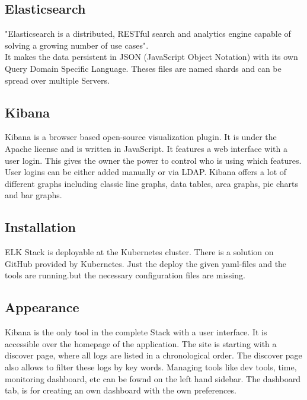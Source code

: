 \subsection{Elasticsearch}
\label{Elasticsearch}
"Elasticsearch is a distributed, RESTful search and analytics engine capable of solving a growing number of use cases"\cite{elasticsearch}.\\ It makes the data persistent in JSON (JavaScript Object Notation) with its own Query Domain Specific Language. Theses files are named shards and can be spread over multiple Servers.
\subsection{Kibana}
Kibana is a browser based open-source visualization plugin. It is under the Apache license and is written in JavaScript. It features a web interface with a user login. This gives the owner the power to control who is using which features. User logins can be either added manually or via LDAP.
Kibana offers a lot of different graphs including classic line graphs, data tables, area graphs, pie charts and bar graphs.
\subsection{Installation}
ELK Stack is deployable at the Kubernetes cluster. There is a solution on GitHub provided by Kubernetes. Just the deploy the given yaml-files and the tools are running.but the necessary configuration files are missing.
\subsection{Appearance}%
Kibana is the only tool in the complete Stack with a user interface. It is accessible over the homepage of the application. The site is starting with a discover page, where all logs are listed in a chronological order. The discover page also allows to filter these logs by key words. Managing tools like dev tools, time, monitoring dashboard, etc can be fownd on the left hand sidebar. The dashboard tab, is for creating an own dashboard with the own preferences.
